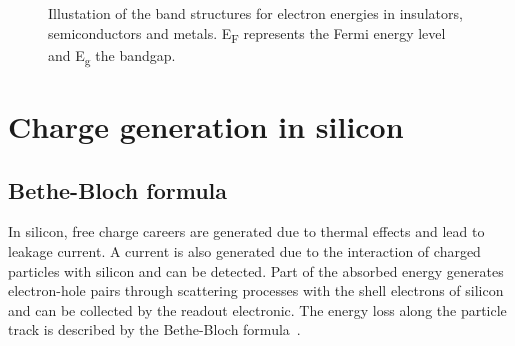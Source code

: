\begin{figure}[htbp]
  \centering
  \caption{Illustation of the band structures for electron energies in
  insulators, semiconductors and metals. E\textsubscript{F} represents the Fermi energy level and E\textsubscript{g} the bandgap.}  
  \label{fig:energyBands}
\end{figure}

\section{Charge generation in silicon}

\subsection{Bethe-Bloch formula}
In silicon, free charge careers are generated due to thermal effects
and lead to leakage current. A current is also generated due to the
interaction of charged particles with silicon and can be
detected. Part of the absorbed energy generates electron-hole pairs
through scattering processes with the shell electrons of silicon and
can be collected by the readout electronic. The energy loss along the
particle track is described by the Bethe-Bloch
formula~\cite{Beringer:1900zz}.

